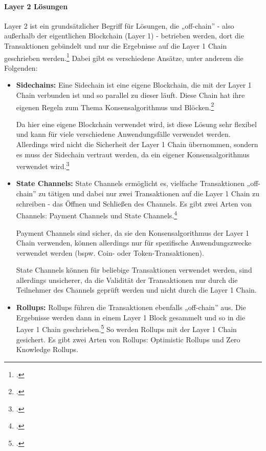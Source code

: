 \paragraph{Layer 2 Lösungen}
\label{sec:definition-layer-2-solutions}

Layer 2 ist ein grundsätzlicher Begriff für Lösungen, die „off-chain” - also außerhalb der eigentlichen Blockchain (Layer 1) - betrieben werden, dort die Transaktionen gebündelt und nur die Ergebnisse auf die Layer 1 Chain geschrieben werden.\footcite[Vgl.][]{w18}
Dabei gibt es verschiedene Ansätze, unter anderem die Folgenden:
\begin{itemize}
    \item \textbf{Sidechains:} 
    Eine Sidechain ist eine eigene Blockchain, die mit der Layer 1 Chain verbunden ist und so parallel zu dieser läuft. 
    Diese Chain hat ihre eigenen Regeln zum Thema Konsensalgorithmus und Blöcken.\footcite[Vgl. hierzu und weiterführend][]{w20}

    \noindent
    Da hier eine eigene Blockchain verwendet wird, ist diese Lösung sehr flexibel und kann für viele verschiedene Anwendungsfälle verwendet werden.
    Allerdings wird nicht die Sicherheit der Layer 1 Chain übernommen, sondern es muss der Sidechain vertraut werden, da ein eigener Konsensalgorithmus verwendet wird.\footcite[Vgl.][]{w21}


    \item \textbf{State Channels:}
    State Channels ermöglicht es, vielfache Transaktionen „off-chain” zu tätigen und dabei nur zwei Transaktionen auf die Layer 1 Chain zu schreiben - das Öffnen und Schließen des Channels.
    Es gibt zwei Arten von Channels: Payment Channels und State Channels.\footcite[Vgl. hierzu und zum Folgenden sowie weiterführend][]{w19}

    \noindent
    Payment Channels sind sicher, da sie den Konsensalgorithmus der Layer 1 Chain verwenden, können allerdings nur für spezifische Anwendungszwecke verwendet werden (bspw. Coin- oder Token-Transaktionen).

    \noindent
    State Channels können für beliebige Transaktionen verwendet werden, sind allerdings unsicherer, da die Validität der Transaktionen nur durch die Teilnehmer des Channels geprüft werden und nicht durch die Layer 1 Chain.


    \item \textbf{Rollups:}
    Rollups führen die Transaktionen ebenfalls „off-chain” aus.
    Die Ergebnisse werden dann in einem Layer 1 Block gesammelt und so in die Layer 1 Chain geschrieben.\footcite[Vgl. hierzu und zum Folgenden][]{w18} 
    So werden Rollups mit der Layer 1 Chain gesichert.
    Es gibt zwei Arten von Rollups: Optimistic Rollups und Zero Knowledge Rollups.


\end{itemize}
